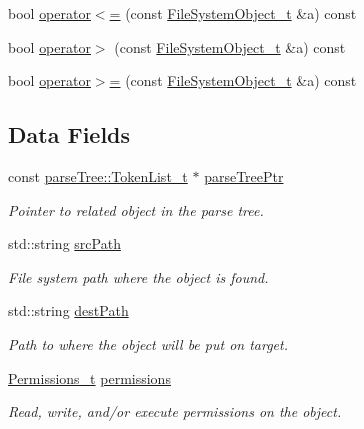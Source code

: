 \begin{DoxyCompactItemize}
\item 
bool \hyperlink{structmodel_1_1_file_system_object__t_a221c2e243ca1c35c7fa4dcb80d00670b}{operator$<$=} (const \hyperlink{structmodel_1_1_file_system_object__t}{File\+System\+Object\+\_\+t} \&a) const 
\item 
bool \hyperlink{structmodel_1_1_file_system_object__t_afe06a168dd07b31a2f4e4c76024cdf9c}{operator$>$} (const \hyperlink{structmodel_1_1_file_system_object__t}{File\+System\+Object\+\_\+t} \&a) const 
\item 
bool \hyperlink{structmodel_1_1_file_system_object__t_a7848f3116c486b35df1bd3266ff5a102}{operator$>$=} (const \hyperlink{structmodel_1_1_file_system_object__t}{File\+System\+Object\+\_\+t} \&a) const 
\end{DoxyCompactItemize}
\subsection*{Data Fields}
\begin{DoxyCompactItemize}
\item 
const \hyperlink{structparse_tree_1_1_token_list__t}{parse\+Tree\+::\+Token\+List\+\_\+t} $\ast$ \hyperlink{structmodel_1_1_file_system_object__t_a0ffb527cd86ef67f573110e08c3841e2}{parse\+Tree\+Ptr}
\begin{DoxyCompactList}\small\item\em Pointer to related object in the parse tree. \end{DoxyCompactList}\item 
std\+::string \hyperlink{structmodel_1_1_file_system_object__t_a140cf9dc6044950e664624da216e1b03}{src\+Path}
\begin{DoxyCompactList}\small\item\em File system path where the object is found. \end{DoxyCompactList}\item 
std\+::string \hyperlink{structmodel_1_1_file_system_object__t_a25f1ec1e11afaf82005c2c6b021a3925}{dest\+Path}
\begin{DoxyCompactList}\small\item\em Path to where the object will be put on target. \end{DoxyCompactList}\item 
\hyperlink{structmodel_1_1_permissions__t}{Permissions\+\_\+t} \hyperlink{structmodel_1_1_file_system_object__t_a9e021ff0837eec52c07ea6805e0e79e5}{permissions}
\begin{DoxyCompactList}\small\item\em Read, write, and/or execute permissions on the object. \end{DoxyCompactList}\end{DoxyCompactItemize}


